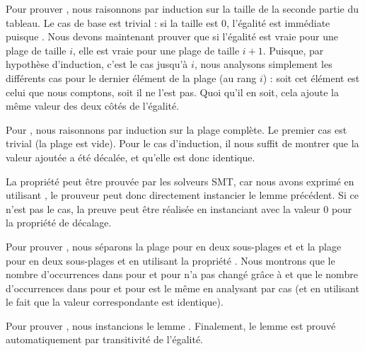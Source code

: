 Pour prouver , nous raisonnons par induction
sur la taille de la seconde partie du tableau. Le cas de base est trivial : si
la taille est 0, l'égalité est immédiate puisque .
Nous devons maintenant prouver que si l'égalité est vraie pour une plage de taille
$i$, elle est vraie pour une plage de taille $i+1$. Puisque, par hypothèse
d'induction, c'est le cas jusqu'à $i$, nous analysons simplement les
différents cas pour le dernier élément de la plage (au rang $i$) : soit cet élément
est celui que nous comptons, soit il ne l'est pas. Quoi qu'il en soit, cela ajoute
la même valeur des deux côtés de l'égalité.


Pour , nous raisonnons par induction sur la
plage complète. Le premier cas est trivial (la plage est vide). Pour le cas
d'induction, il nous suffit de montrer que la valeur ajoutée a été décalée, et
qu'elle est donc identique.


La propriété  peut être prouvée par les
solveurs SMT, car nous avons exprimé  en
utilisant , le prouveur peut donc directement instancier le
lemme précédent. Si ce n'est pas le cas, la preuve peut être réalisée en
instanciant  avec la valeur 0 pour la
propriété de décalage.


Pour prouver , nous séparons la plage
pour  en deux sous-plages  et
 et la plage pour  en deux sous-plages
 et  en utilisant la propriété
. Nous montrons que le nombre d'occurrences
dans  pour  et 
pour  n'a pas changé grâce à 
et que le nombre d'occurrences dans  pour
 et  pour  est le même
en analysant par cas (et en utilisant le fait que la valeur correspondante est
identique).


Pour prouver , nous instancions le lemme
. Finalement, le lemme
 est prouvé automatiquement par transitivité
de l'égalité.




